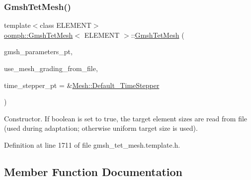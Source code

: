 \subsubsection{\texorpdfstring{Gmsh\+Tet\+Mesh()}{GmshTetMesh()}\hspace{0.1cm}{\footnotesize\ttfamily [2/2]}}
{\footnotesize\ttfamily template$<$class E\+L\+E\+M\+E\+NT$>$ \\
\hyperlink{classoomph_1_1GmshTetMesh}{oomph\+::\+Gmsh\+Tet\+Mesh}$<$ E\+L\+E\+M\+E\+NT $>$\+::\hyperlink{classoomph_1_1GmshTetMesh}{Gmsh\+Tet\+Mesh} (\begin{DoxyParamCaption}\item[{\hyperlink{classoomph_1_1GmshParameters}{Gmsh\+Parameters} $\ast$}]{gmsh\+\_\+parameters\+\_\+pt,  }\item[{const bool \&}]{use\+\_\+mesh\+\_\+grading\+\_\+from\+\_\+file,  }\item[{\hyperlink{classoomph_1_1TimeStepper}{Time\+Stepper} $\ast$}]{time\+\_\+stepper\+\_\+pt = {\ttfamily \&\hyperlink{classoomph_1_1Mesh_a12243d0fee2b1fcee729ee5a4777ea10}{Mesh\+::\+Default\+\_\+\+Time\+Stepper}} }\end{DoxyParamCaption})\hspace{0.3cm}{\ttfamily [inline]}}



Constructor. If boolean is set to true, the target element sizes are read from file (used during adaptation; otherwise uniform target size is used). 



Definition at line 1711 of file gmsh\+\_\+tet\+\_\+mesh.\+template.\+h.



\subsection{Member Function Documentation}
\mbox{\label{classoomph_1_1GmshTetMesh_a80132087ae6dd00c7631823a8453e078}} 
